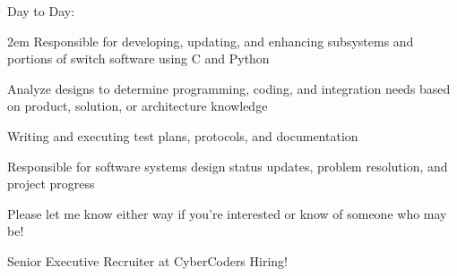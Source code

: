 Day to Day:

{\parindent 2em
Responsible for developing, updating, and enhancing subsystems and portions of switch software using C and Python

Analyze designs to determine programming, coding, and integration needs based on product, solution, or architecture knowledge

Writing and executing test plans, protocols, and documentation

Responsible for software systems design status updates, problem resolution, and project progress
}

Please let me know either way if you're interested or know of someone who may be!


Senior Executive Recruiter at CyberCoders\- Hiring!

\bye
